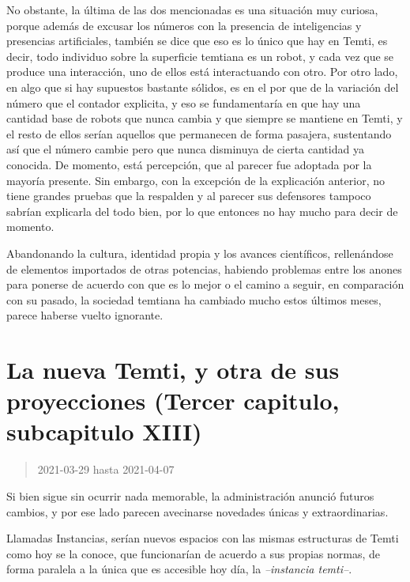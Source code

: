 \documentclass[
  spanish,
]{book}
\begin{document}
No obstante, la última de las dos mencionadas es una situación muy curiosa, porque además de excusar los números con la presencia de inteligencias y presencias artificiales, también se dice que eso es lo único que hay en Temti, es decir, todo individuo sobre la superficie temtiana es un robot, y cada vez que se produce una interacción, uno de ellos está interactuando con otro. Por otro lado, en algo que si hay supuestos bastante sólidos, es en el por que de la variación del número que el contador explicita, y eso se fundamentaría en que hay una cantidad base de robots que nunca cambia y que siempre se mantiene en Temti, y el resto de ellos serían aquellos que permanecen de forma pasajera, sustentando así que el número cambie pero que nunca disminuya de cierta cantidad ya conocida.
De momento, está percepción, que al parecer fue adoptada por la mayoría presente. Sin embargo, con la excepción de la explicación anterior, no tiene grandes pruebas que la respalden y al parecer sus defensores tampoco sabrían explicarla del todo bien, por lo que entonces no hay mucho para decir de momento.

Abandonando la cultura, identidad propia y los avances científicos, rellenándose de elementos importados de otras potencias, habiendo problemas entre los anones para ponerse de acuerdo con que es lo mejor o el camino a seguir, en comparación con su pasado, la sociedad temtiana ha cambiado mucho estos últimos meses, parece haberse vuelto ignorante.

\hypertarget{la-nueva-temti-y-otra-de-sus-proyecciones-tercer-capitulo-subcapitulo-xiii}{%
\section{La nueva Temti, y otra de sus proyecciones (Tercer capitulo, subcapitulo XIII)}\label{la-nueva-temti-y-otra-de-sus-proyecciones-tercer-capitulo-subcapitulo-xiii}}

\begin{quote}
2021-03-29 hasta 2021-04-07
\end{quote}

Si bien sigue sin ocurrir nada memorable, la administración anunció futuros cambios, y por ese lado parecen avecinarse novedades únicas y extraordinarias.

Llamadas Instancias, serían nuevos espacios con las mismas estructuras de Temti como hoy se la conoce, que funcionarían de acuerdo a sus propias normas, de forma paralela a la única que es accesible hoy día, la \emph{--instancia temti--}.
\end{document}

